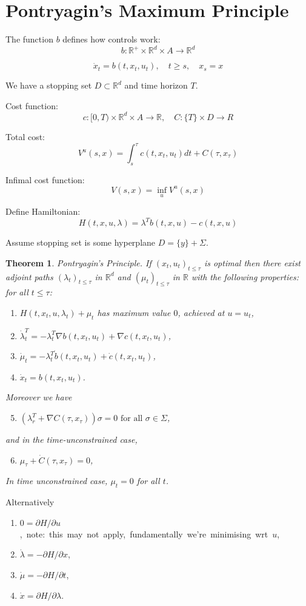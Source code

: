 \documentclass[12pt]{article}
\begin{document}
\newcommand{\R}{\mathbb{R}}
\newtheorem{theorem}{Theorem}

\section{Pontryagin's Maximum Principle}

The function $b$ defines how controls work:
\[
b:\R^+\times\R^d\times A\rightarrow\R^d
\]

\[
\dot{x}_t = b(t,x_t,u_t), \quad t\ge s, \quad x_s = x
\]

We have a stopping set $D\subset\R^d$ and time horizon $T$.

Cost function:
\[
c:[0,T)\times\R^d\times A\rightarrow\R, \quad C:\{T\}\times D\rightarrow R
\]

Total cost:
\[
V^u(s,x) = \int_s^\tau c(t,x_t,u_t)dt+C(\tau,x_\tau)
\]

Infimal cost function:
\[
V(s,x) = \inf_u V^u(s,x)
\]

Define Hamiltonian:
\[
H(t,x,u,\lambda) = \lambda^T b(t,x,u)-c(t,x,u)
\]

Assume stopping set is some hyperplane $D = \{y\}+\Sigma$.

\begin{theorem} Pontryagin's Principle.
If $(x_t,u_t)_{t\le\tau}$ is optimal then there exist adjoint paths $(\lambda_t)_{t\le\tau}$ in $\R^d$ and $(\mu_t)_{t\le\tau}$ in $\R$ with the following properties: for all $t\le\tau$:

\begin{enumerate}
\item $H(t,x_t,u,\lambda_t)+\mu_t$ has maximum value $0$, achieved at $u=u_t$,
\item $\dot{\lambda}_t^T = -\lambda_t^T\nabla b(t,x_t,u_t)+\nabla c(t,x_t,u_t)$,
\item $\dot{\mu}_t = -\lambda_t^T\dot{b}(t,x_t,u_t)+\dot{c}(t,x_t,u_t)$,
\item $\dot{x}_t = b(t,x_t,u_t)$.
\end{enumerate}
Moreover we have
\begin{enumerate}
\setcounter{enumi}{4}
\item $(\lambda_r^T+\nabla C(\tau,x_\tau))\sigma = 0\mbox{ for all }\sigma\in\Sigma$,
\end{enumerate}
and in the time-unconstrained case,
\begin{enumerate}
\setcounter{enumi}{5}
\item $\mu_\tau+\dot{C}(\tau,x_\tau) = 0$,
\end{enumerate}
In time unconstrained case, $\mu_t=0$ for all $t$.
\end{theorem}
Alternatively
\begin{enumerate}
\item $0 = \partial H/\partial u$,\mbox{ note: this may not apply, fundamentally we're minimising wrt $u$},
\item $\dot{\lambda} = -\partial H/\partial x$,
\item $\dot{\mu} = -\partial H/\partial t$,
\item $\dot{x} = \partial H/\partial\lambda$.
\end{enumerate}
\end{document}
